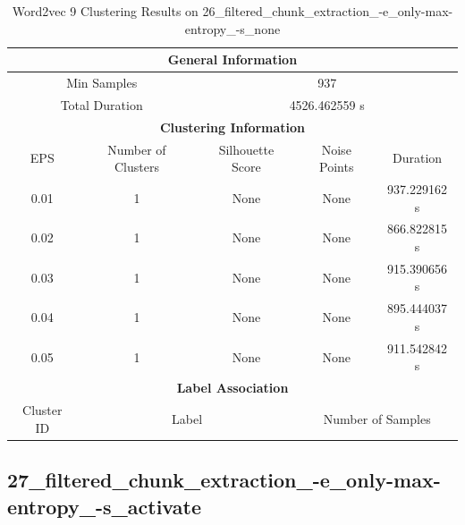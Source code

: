 \begin{longtable}{|c|c|c|c|c|}
\caption{Word2vec 9 Clustering Results on 26\_filtered\_chunk\_extraction\_-e\_only-max-entropy\_-s\_none} \label{tab:26_filtered_chunk_extraction_-e_only-max-entropy_-s_none_word2vec_9_clustering_results}\\
\hline
\multicolumn{5}{|c|}{\textbf{General Information}} \\
\hline
\multicolumn{2}{|c|}{Min Samples} & \multicolumn{3}{c|}{937} \\
\multicolumn{2}{|c|}{Total Duration} & \multicolumn{3}{c|}{4526.462559 s} \\
\hline
\multicolumn{5}{|c|}{\textbf{Clustering Information}} \\
\hline
EPS & Number of Clusters & Silhouette Score & Noise Points & Duration \\
0.01 & 1 & None & None & 937.229162 s\\
0.02 & 1 & None & None & 866.822815 s\\
0.03 & 1 & None & None & 915.390656 s\\
0.04 & 1 & None & None & 895.444037 s\\
0.05 & 1 & None & None & 911.542842 s\\
\hline
\multicolumn{5}{|c|}{\textbf{Label Association}} \\
\hline
Cluster ID & \multicolumn{2}{c|}{Label} & \multicolumn{2}{c|}{Number of Samples} \\
\hline
\end{longtable}


\subsection{27\_filtered\_chunk\_extraction\_-e\_only-max-entropy\_-s\_activate}

